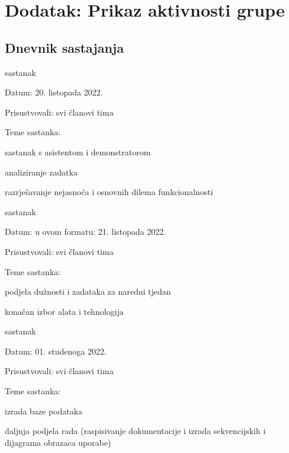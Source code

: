 \chapter*{Dodatak: Prikaz aktivnosti grupe}
		
		\section*{Dnevnik sastajanja}
  
		\begin{packed_enum}
			\item  sastanak
			
			\item[] \begin{packed_item}
				\item Datum: 20. listopada 2022.
				\item Prisustvovali: svi članovi tima
				\item Teme sastanka:
				\begin{packed_item}
					\item  sastanak s asistentom i demonstratorom
					\item  analiziranje zadatka
                        \item razrješavanje nejasnoća i osnovnih dilema funkcionalnosti
				\end{packed_item}
			\end{packed_item}
			
			\item  sastanak
			\item[] \begin{packed_item}
				\item Datum: u ovom formatu: 21. listopada 2022.
				\item Prisustvovali: svi članovi tima
				\item Teme sastanka:
				\begin{packed_item}
					\item  podjela dužnosti i zadataka za naredni tjedan
					\item  konačan izbor alata i tehnologija
				\end{packed_item}
			\end{packed_item}

                \item  sastanak
			\item[] \begin{packed_item}
				\item Datum: 01. studenoga 2022.
				\item Prisustvovali: svi članovi tima
				\item Teme sastanka:
				\begin{packed_item}
					\item  izrada baze podataka
					\item  daljnja podjela rada (raspisivanje dokumentacije i izrada sekvencijskih i dijagrama obrazaca uporabe)
				\end{packed_item}
			\end{packed_item}


\end{packed_enum}

